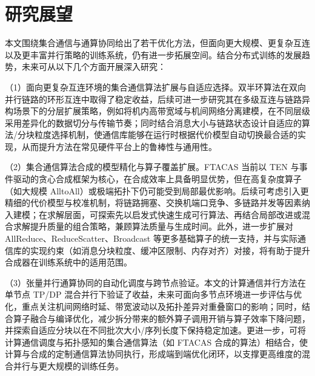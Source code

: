 \section{研究展望}

本文围绕集合通信与通算协同给出了若干优化方法，但面向更大规模、更复杂互连以及更丰富并行策略的训练系统，仍有进一步拓展空间。结合分布式训练的发展趋势，未来可从以下几个方面开展深入研究：

（1）面向更复杂互连环境的集合通信算法扩展与自适应选择。双半环算法在双向并行链路的环形互连中取得了稳定收益，后续可进一步研究其在多级互连与链路异构场景下的分层扩展策略，例如将机内高带宽域与机间网络分离建模，在不同层级采用差异化的数据切分与传输节奏；同时结合消息大小与链路状态设计自适应的算法/分块粒度选择机制，使通信库能够在运行时根据代价模型自动切换最合适的实现，从而提升方法在常见硬件平台上的鲁棒性与通用性。

（2）集合通信算法合成的模型精化与算子覆盖扩展。FTACAS 当前以 TEN 与事件驱动的贪心合成框架为核心，在合成效率上具备明显优势，但在高复杂度算子（如大规模 AlltoAll）或极端拓扑下仍可能受到局部最优影响。后续可考虑引入更精细的代价模型与校准机制，将链路拥塞、交换机端口竞争、多链路并发等因素纳入建模；在求解层面，可探索先以启发式快速生成可行算法、再结合局部改进或混合求解提升质量的组合策略，兼顾算法质量与生成时间。此外，进一步扩展对 AllReduce、ReduceScatter、Broadcast 等更多基础算子的统一支持，并与实际通信库的实现约束（如消息分块粒度、缓冲区限制、内存对齐）对接，将有助于提升合成器在训练系统中的适用范围。

（3）张量并行通算协同的自动化调度与跨节点验证。本文的计算通信并行方法在单节点 TP/DP 混合并行下验证了收益，未来可面向多节点环境进一步评估与优化，重点关注机间网络时延、带宽波动以及拓扑差异对重叠窗口的影响；同时，结合算子融合与编译优化，减少拆分带来的额外算子调用开销与算子效率下降问题，并探索自适应分块以在不同批次大小/序列长度下保持稳定加速。更进一步，可将计算通信调度与拓扑感知的集合通信算法（如 FTACAS 合成的算法）相结合，使计算与合成的定制通信算法协同执行，形成端到端优化闭环，以支撑更高维度的混合并行与更大规模的训练任务。
